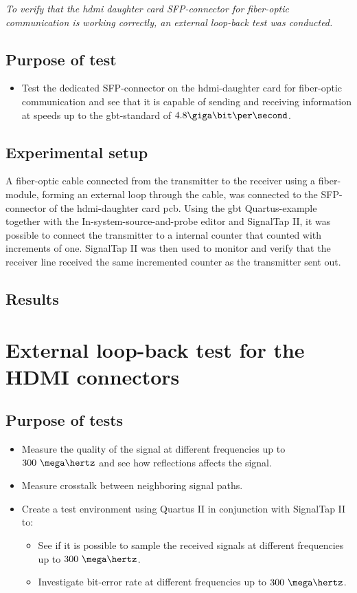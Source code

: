 \documentclass[main.tex]{subfiles}
\begin{document}
\textit{To verify that the \gls{hdmi} daughter card SFP-connector for fiber-optic communication is working correctly, an external loop-back test was conducted.}

\subsection{Purpose of test}
\begin{itemize}

\item Test the dedicated SFP-connector on the \gls{hdmi}-daughter card for fiber-optic communication and see that it is capable of sending and receiving information at speeds up to the \gls{gbt}-standard of $4.8 \giga\bit\per\second$. 
\end{itemize}

\subsection{Experimental setup}
A fiber-optic cable connected from the transmitter to the receiver using a fiber-module, forming an external loop through the cable, was connected to the SFP-connector of the \gls{hdmi}-daughter card \gls{pcb}. Using the \gls{gbt} Quartus-example together with the In-system-source-and-probe editor and SignalTap II, it was possible to connect the transmitter to a internal counter that counted with increments of one. SignalTap II was then used to monitor and verify that the receiver line received the same incremented counter as the transmitter sent out.

\subsection{Results}


\section{External loop-back test for the HDMI connectors}

\subsection{Purpose of tests}

\begin{itemize}
\item Measure the quality of the signal at different frequencies up to $300~\mega\hertz$ and see how reflections affects the signal.
\item Measure crosstalk between neighboring signal paths.
\item Create a test environment using Quartus II in conjunction with SignalTap II to:
\begin{itemize}
  \item See if it is possible to sample the received signals at different frequencies up to $300~\mega\hertz$.
  \item Investigate bit-error rate at different frequencies up to $300~\mega\hertz$.
\end{itemize}
\end{itemize}
\end{document}
